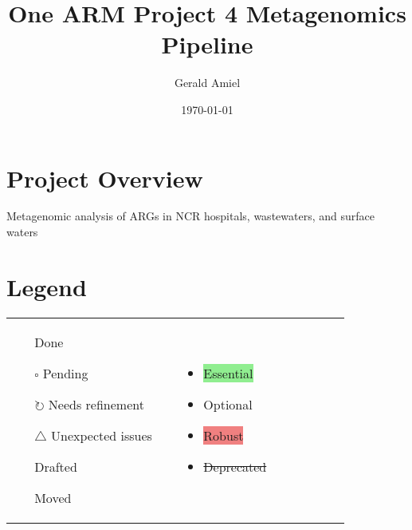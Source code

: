 \documentclass[11pt]{article}
\title{One ARM Project 4 Metagenomics Pipeline}
\author{Gerald Amiel}
\date{\today}
\newcommand{\done}{\checkmark}  %
\newcommand{\pending}{$\square$}  %
\newcommand{\refine}{$\circlearrowright$}  %
\newcommand{\issue}{$\triangle$}  %
\newcommand{\draft}{\faPencil}
\newcommand{\moved}{\faArrowCircleRight}
\newcommand{\highlightessential}[1]{\colorbox{lightgreen}{#1}}  %
\newcommand{\highlightoptional}[1]{\colorbox{lightorange}{#1}}  %
\newcommand{\highlightrobust}[1]{\colorbox{lightcoral}{#1}}  %
\newcommand{\deprecated}[1]{\sout{#1}}  %
\begin{document}
	
	\twocolumn
	\maketitle
	
	\section{Project Overview}
	Metagenomic analysis of ARGs in NCR hospitals, wastewaters, and surface waters

\section{Legend}
\begin{tabular}{p{0.45\linewidth} p{0.45\linewidth}}  %
	\begin{itemize}
		\item [\done] Done
		\item [\pending] Pending
		\item [\refine] Needs refinement
		\item [\issue] Unexpected issues
		\item [\draft] Drafted
		\item [\moved] Moved
	\end{itemize}
	&
	\begin{itemize}
		\item \highlightessential{Essential}
		\item \highlightoptional{Optional}
		\item \highlightrobust{Robust}
		\item \deprecated{Deprecated}  %
	\end{itemize}
\end{tabular}



	
\end{document}
